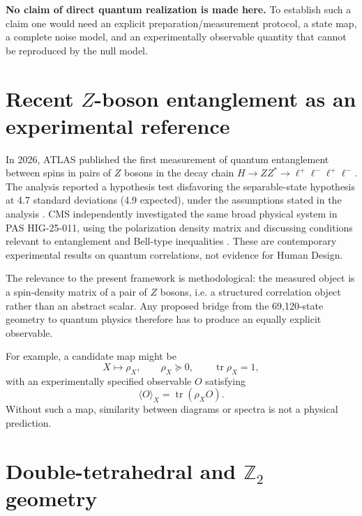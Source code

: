 \documentclass[11pt,a4paper]{article}
\numberwithin{equation}{section}
\newcommand{\tr}{\operatorname{tr}}
\begin{document}
\textbf{No claim of direct quantum realization is made here.} To establish such a claim one would need an explicit preparation/measurement protocol, a state map, a complete noise model, and an experimentally observable quantity that cannot be reproduced by the null model.

\section{Recent $Z$-boson entanglement as an experimental reference}
\label{sec:Zent}

In 2026, ATLAS published the first measurement of quantum entanglement between spins in pairs of $Z$ bosons in the decay chain $H\to ZZ^*\to\ell^+\ell^-\ell^+\ell^-$. The analysis reported a hypothesis test disfavoring the separable-state hypothesis at 4.7 standard deviations (4.9 expected), under the assumptions stated in the analysis \citep{ATLASZEntanglement2026}. CMS independently investigated the same broad physical system in PAS HIG-25-011, using the polarization density matrix and discussing conditions relevant to entanglement and Bell-type inequalities \citep{CMSHIG25011}. These are contemporary experimental results on quantum correlations, not evidence for Human Design.

The relevance to the present framework is methodological: the measured object is a spin-density matrix of a pair of $Z$ bosons, i.e. a structured correlation object rather than an abstract scalar. Any proposed bridge from the 69,120-state geometry to quantum physics therefore has to produce an equally explicit observable.

For example, a candidate map might be
\begin{equation}
X\longmapsto\rho_X,
\qquad
\rho_X\succeq0,
\qquad
\tr\rho_X=1,
\end{equation}
with an experimentally specified observable $O$ satisfying
\begin{equation}
\langle O\rangle_X=\tr(\rho_X O).
\end{equation}
Without such a map, similarity between diagrams or spectra is not a physical prediction.

\section{Double-tetrahedral and $\mathbb Z_2$ geometry}
\label{sec:doubletetra}
\end{document}
